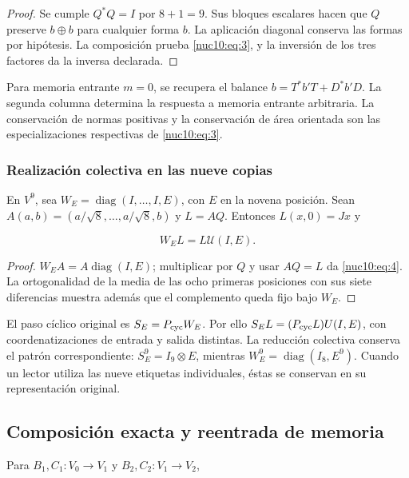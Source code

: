 \begin{proof}
Se cumple \(Q^*Q=I\) por \(8+1=9\). Sus bloques escalares hacen que \(Q\) preserve \(b\oplus b\) para cualquier forma \(b\). La aplicación diagonal conserva las formas por hipótesis. La composición prueba \eqref{nuc10:eq:3}, y la inversión de los tres factores da la inversa declarada.
\end{proof}

Para memoria entrante \(m=0\), se recupera el balance \(b=T^*b'T+D^*b'D\). La segunda columna determina la respuesta a memoria entrante arbitraria. La conservación de normas positivas y la conservación de área orientada son las especializaciones respectivas de \eqref{nuc10:eq:3}.

\subsubsection{Realización colectiva en las nueve copias}

En \(V^9\), sea \(W_E=\operatorname{diag}(I,\ldots,I,E)\), con \(E\) en la novena posición. Sean \(A(a,b)=(a/\sqrt8,\ldots,a/\sqrt8,b)\) y \(L=AQ\). Entonces \(L(x,0)=Jx\) y



\begin{equation}
W_E L=L\mathcal U(I,E).
\label{nuc10:eq:4}
\end{equation}



\begin{proof}
\(W_EA=A\operatorname{diag}(I,E)\); multiplicar por \(Q\) y usar \(AQ=L\) da \eqref{nuc10:eq:4}. La ortogonalidad de la media de las ocho primeras posiciones con sus siete diferencias muestra además que el complemento queda fijo bajo \(W_E\).
\end{proof}

El paso cíclico original es \(S_E=P_{\rm cyc}W_E\). Por ello \(S_EL=(P_{\rm cyc}L)U(I,E)\), con coordenatizaciones de entrada y salida distintas. La reducción colectiva conserva el patrón correspondiente: \(S_E^9=I_9\otimes E\), mientras \(W_E^9=\operatorname{diag}(I_8,E^9)\). Cuando un lector utiliza las nueve etiquetas individuales, éstas se conservan en su representación original.

\subsection{Composición exacta y reentrada de memoria}

Para \(B_1,C_1:V_0\to V_1\) y \(B_2,C_2:V_1\to V_2\),



